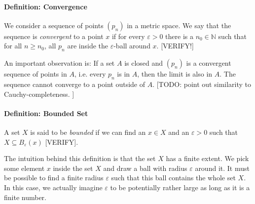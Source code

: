 

\paragraph{Definition: Convergence} We consider a sequence of points $(p_n)$ in a metric space. We say that the sequence is \emph{convergent} to a point $x$ if for every $\varepsilon > 0$ there is a $n_0 \in \mathbb{N}$ such that for all $n \geq n_0$, all $p_n$ are inside the $\varepsilon$-ball around $x$. [VERIFY!]

\medskip
An important observation is: If a set $A$ is closed and $(p_n)$ is a convergent sequence of points in $A$, i.e. every $p_n$ is in $A$, then the limit is also in $A$. The sequence cannot converge to a point outside of $A$. [TODO: point out similarity to Cauchy-completeness. ]





% 


\paragraph{Definition: Bounded Set} A set $X$ is said to be \emph{bounded} if we can find an $x \in X$ and an $\varepsilon > 0$ such that $X \subseteq B_\varepsilon(x)$ [VERIFY]. 

\medskip
The intuition behind this definition is that the set $X$ has a finite extent. We pick some element $x$ inside the set $X$ and draw a ball with radius $\varepsilon$ around it. It must be possible to find a finite radius $\varepsilon$ such that this ball contains the whole set $X$. In this case, we actually imagine $\varepsilon$ to be potentially rather large as long as it is a finite number.

